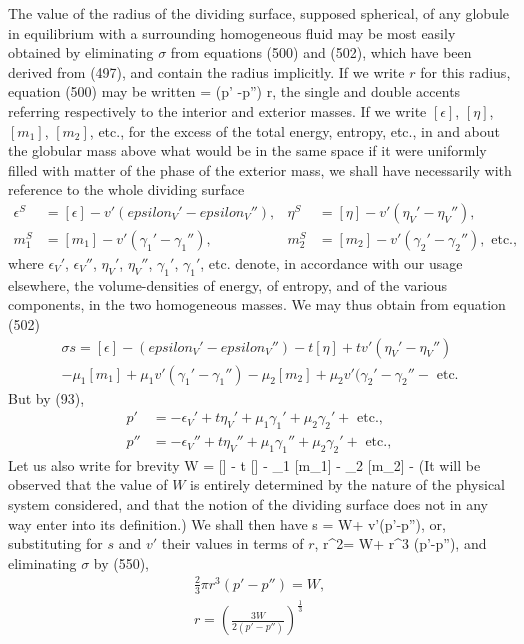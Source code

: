 \documentclass[12pt]{article}
\begin{document}
{The value of the radius of the dividing surface, supposed spherical, of any globule in equilibrium with a surrounding homogeneous fluid may be most easily obtained by eliminating $\sigma$ from equations (500) and (502), which have been derived from (497), and contain the radius implicitly. If we write $r$ for this radius, equation (500) may be written
\sigma = (p' -p'') r,   \label{550}\eqe
the single and double accents referring respectively to the interior and exterior masses. If we write $[\epsilon]$, $[\eta]$, $[m_1]$, $[m_2]$, etc., for the excess of the total energy, entropy, etc., in and about the globular mass above what would be in the same space if it were uniformly filled with matter of the phase of the exterior mass, we shall have necessarily with reference to the whole dividing surface
\begin{align*}
\epsilon^S&= [\epsilon] - v'(epsilon_V' - epsilon_V''), & \eta^S &= [\eta] - v'(\eta_V' - \eta_V''), \\
m_1^S &= [m_1] - v'(\gamma_1' - \gamma_1''), & m_2^S &= [m_2]- v'(\gamma_2' - \gamma_2''), \text{ etc.},\end{align*}
where $\epsilon_V'$, $\epsilon_V''$, $\eta_V'$, $\eta_V''$, $\gamma_1'$, $\gamma_1'$, etc. denote, in accordance with our usage elsewhere, the volume-densities of energy, of entropy, and of the various components, in the two homogeneous masses. We may thus obtain from equation (502)
\begin{multline}\sigma s = [\epsilon] -(epsilon_V' - epsilon_V'')- t[\eta] + tv'(\eta_V' - \eta_V'') \\
- \mu_1 [m_1] + \mu_1v'(\gamma_1' - \gamma_1'')- \mu_2[m_2] + \mu_2v'(\gamma_2' - \gamma_2''- \text{ etc.} \label{551} \end{multline}
But by (93),
\begin{align*} 
p' &= - \epsilon_V' + t\eta_V' + \mu_1\gamma_1'+ \mu_2\gamma_2' + \text{ etc.}, \\
p'' &= - \epsilon_V'' + t\eta_V'' + \mu_1\gamma_1''+ \mu_2\gamma_2' + \text{ etc.},\end{align*}
Let us also write for brevity
\eqs W = [\epsilon] - t [\eta] - \mu_1 [m_1] - \mu_2 [m_2] -  \label{552}\eqe
(It will be observed that the value of $W$ is entirely determined by the nature of the physical system considered, and that the notion of the dividing surface does not in any way enter into its definition.) We shall then have
\eqs \sigma s = W+ v'(p'-p''),  \label{553}\eqe
or, substituting for $s$ and $v'$ their values in terms of $r$,
\pi r^2\sigma = W+ \pi r^3 (p'-p''),  \label{554}\eqe
and eliminating $\sigma$ by (550),
\begin{gather}
\tfrac{2}{3}\pi r^3 (p'-p'')= W,    \label{555} \\
r= \left( \frac{3W}{2(p'-p'')}\right)^{\frac{1}{3}}   \label{556} \end{gather}

}
\end{document}
